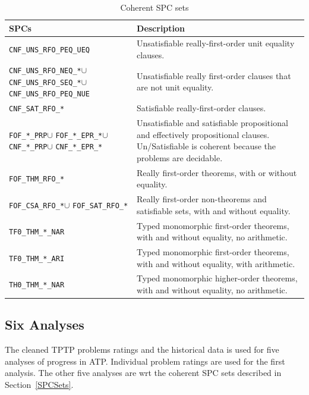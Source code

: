 \documentclass[runningheads]{llncs}
\begin{document}
\begin{table}[h!]
\renewcommand{\arraystretch}{1.5}
\center
\begin{tabular}{p{3.5cm}|p{8.0cm}}
\hline
SPCs & Description \\
\hline
{\tt CNF\_UNS\_RFO\_PEQ\_UEQ} &
Unsatisfiable really-first-order unit equality clauses. \\
{\tt CNF\_UNS\_RFO\_NEQ\_*}\enspace$\cup$ {\tt CNF\_UNS\_RFO\_SEQ\_*}\enspace$\cup$
{\tt CNF\_UNS\_RFO\_PEQ\_NUE} &
Unsatisfiable really first-order clauses that are not unit equality. \\
{\tt CNF\_SAT\_RFO\_*} &
Satisfiable really-first-order clauses. \\
{\tt FOF\_*\_PRP}\enspace$\cup$ {\tt FOF\_*\_EPR\_*}\enspace$\cup$
{\tt CNF\_*\_PRP}\enspace$\cup$ {\tt CNF\_*\_EPR\_*} &
Unsatisfiable and satisfiable propositional and effectively propositional clauses.
Un/Satisfiable is coherent because the problems are decidable. \\
{\tt FOF\_THM\_RFO\_*} &
Really first-order theorems, with or without equality. \\
{\tt FOF\_CSA\_RFO\_*}\enspace$\cup$ {\tt FOF\_SAT\_RFO\_*} &
Really first-order non-theorems and satisfiable sets, with and without equality. \\
{\tt TF0\_THM\_*\_NAR} &
Typed monomorphic first-order theorems, with and without equality, no arithmetic. \\
{\tt TF0\_THM\_*\_ARI} &
Typed monomorphic first-order theorems, with and without equality, with arithmetic. \\
{\tt TH0\_THM\_*\_NAR} &
Typed monomorphic higher-order theorems, with and without equality, no arithmetic. \\
\hline
\end{tabular}
\vspace*{0.5em}
\caption{Coherent SPC sets}
\label{SPCSetsTable}
\end{table}

\subsection{Six Analyses}
\label{AnalysisTypes}

The cleaned TPTP problems ratings and the historical data is used for five analyses of progress
in ATP.
Individual problem ratings are used for the first analysis.
The other five analyses are wrt the coherent SPC sets described in Section~\ref{SPCSets}.
\end{document}
